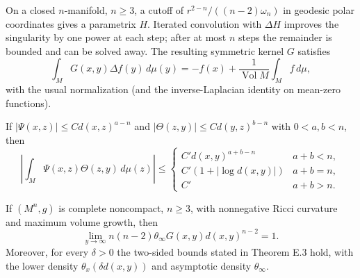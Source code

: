 \begin{theorem}
\label{thm:chow-ii-closed-manifold-green-function}


On a closed $n$-manifold, $n\ge3$, a cutoff of
$r^{2-n}/((n-2)\omega_n)$ in geodesic polar coordinates gives a parametrix
$H$.  Iterated convolution with $\Delta H$ improves the singularity by one
power at each step; after at most $n$ steps the remainder is bounded and can
be solved away.  The resulting symmetric kernel $G$ satisfies
\[
\int_M G(x,y)\Delta f(y)\,d\mu(y)=-f(x)+\frac1{\operatorname{Vol}M}\int_M f\,d\mu,
\]
with the usual normalization (and the inverse-Laplacian identity on mean-zero
functions).
\end{theorem}

\begin{lemma}
\label{lem:chow-ii-green-convolution-estimate}

If $|\Psi(x,z)|\le C d(x,z)^{a-n}$ and
$|\Theta(z,y)|\le C d(y,z)^{b-n}$ with $0<a,b<n$, then
\[
\left|\int_M\Psi(x,z)\Theta(z,y)\,d\mu(z)\right|
\le\begin{cases}C'd(x,y)^{a+b-n}&a+b<n,\\
C'(1+|\log d(x,y)|)&a+b=n,\\ C'&a+b>n.
\end{cases}
\]
\end{lemma}

\begin{theorem}
\label{thm:chow-ii-green-asymptotics}


If $(M^n,g)$ is complete noncompact, $n\ge3$, with nonnegative Ricci
curvature and maximum volume growth, then
\[
\lim_{y\to\infty}n(n-2)\theta_\infty G(x,y)d(x,y)^{n-2}=1.
\]
Moreover, for every $\delta>0$ the two-sided bounds stated in Theorem E.3
hold, with the lower density $\theta_x(\delta d(x,y))$ and asymptotic density
$\theta_\infty$.
\end{theorem}

